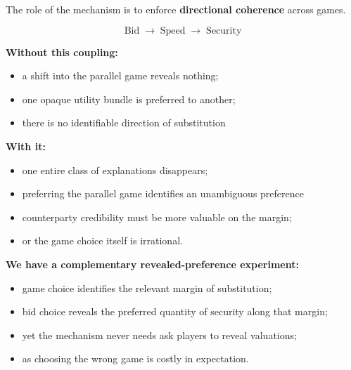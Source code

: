 \documentclass[11pt]{article}
\begin{document}
The role of the mechanism is to enforce \textbf{directional coherence} across games.

\[
\boxed{\text{Bid} \;\longrightarrow\; \text{Speed} \;\longrightarrow\; \text{Security}}
\]


\vspace{0.20cm}

{\normalsize\bfseries
Without this coupling:
}

\begin{itemize}

\item a shift into the parallel game reveals nothing;
\item one opaque utility bundle is preferred to another;
\item there is no identifiable direction of substitution

\end{itemize}

\vspace{0.20cm}

{\normalsize\bfseries
With it:
}

\begin{itemize}

\item one entire class of explanations disappears;
\item preferring the parallel game identifies an unambiguous preference
\item counterparty credibility must be more valuable on the margin;
\item or the game choice itself is irrational.

\end{itemize}

\vspace{0.35cm}


{\normalsize\bfseries
We have a complementary revealed-preference experiment:
}

\begin{itemize}

\item game choice identifies the relevant margin of substitution;
\item bid choice reveals the preferred quantity of security along that margin;
\item yet the mechanism never needs ask players to reveal valuations;
\item as choosing the wrong game is costly in expectation.

\end{itemize}
\end{document}
